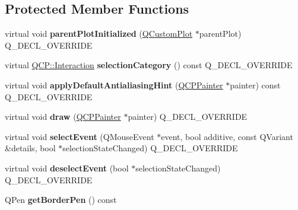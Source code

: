 \subsection*{Protected Member Functions}
\begin{DoxyCompactItemize}
\item 
\mbox{\label{class_q_c_p_legend_a2b225cefb5eb267771e2c7c44fd2b408}} 
virtual void {\bfseries parent\+Plot\+Initialized} (\hyperlink{class_q_custom_plot}{Q\+Custom\+Plot} $\ast$parent\+Plot) Q\+\_\+\+D\+E\+C\+L\+\_\+\+O\+V\+E\+R\+R\+I\+DE
\item 
\mbox{\label{class_q_c_p_legend_a1a2075e462984f9ff51d9c75bda3581b}} 
virtual \hyperlink{namespace_q_c_p_a2ad6bb6281c7c2d593d4277b44c2b037}{Q\+C\+P\+::\+Interaction} {\bfseries selection\+Category} () const Q\+\_\+\+D\+E\+C\+L\+\_\+\+O\+V\+E\+R\+R\+I\+DE
\item 
\mbox{\label{class_q_c_p_legend_a817f75c234f82a2e26643dc0de742095}} 
virtual void {\bfseries apply\+Default\+Antialiasing\+Hint} (\hyperlink{class_q_c_p_painter}{Q\+C\+P\+Painter} $\ast$painter) const Q\+\_\+\+D\+E\+C\+L\+\_\+\+O\+V\+E\+R\+R\+I\+DE
\item 
\mbox{\label{class_q_c_p_legend_a74f93358d2b4a76ec95c3a5d825582a3}} 
virtual void {\bfseries draw} (\hyperlink{class_q_c_p_painter}{Q\+C\+P\+Painter} $\ast$painter) Q\+\_\+\+D\+E\+C\+L\+\_\+\+O\+V\+E\+R\+R\+I\+DE
\item 
\mbox{\label{class_q_c_p_legend_a71f54a05c3e5b1a1ade1864422cd642e}} 
virtual void {\bfseries select\+Event} (Q\+Mouse\+Event $\ast$event, bool additive, const Q\+Variant \&details, bool $\ast$selection\+State\+Changed) Q\+\_\+\+D\+E\+C\+L\+\_\+\+O\+V\+E\+R\+R\+I\+DE
\item 
\mbox{\label{class_q_c_p_legend_ac2066837f7ebc32a5b15434cdca5b176}} 
virtual void {\bfseries deselect\+Event} (bool $\ast$selection\+State\+Changed) Q\+\_\+\+D\+E\+C\+L\+\_\+\+O\+V\+E\+R\+R\+I\+DE
\item 
\mbox{\label{class_q_c_p_legend_a1cf9df6f2130c5ad842dc92188ab6bd7}} 
Q\+Pen {\bfseries get\+Border\+Pen} () const
\item 

\end{DoxyCompactItemize}
